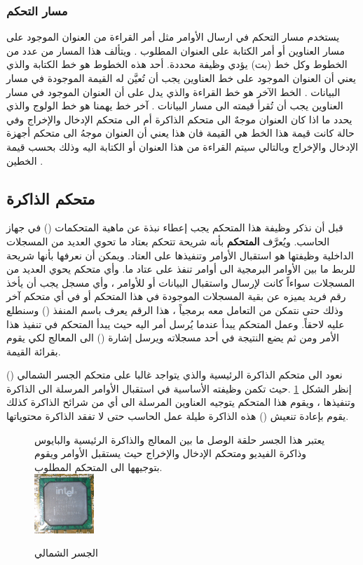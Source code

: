 \documentclass[document.tex]{subfiles}
\begin{document}
\subsubsection{مسار التحكم }
يستخدم مسار التحكم في ارسال الأوامر مثل أمر القراءة من العنوان الموجود على مسار العناوين أو أمر الكتابة على العنوان المطلوب . ويتألف هذا المسار من عدد من الخطوط وكل خط (بت) يؤدي وظيفة محددة. أحد هذه الخطوط هو خط الكتابة  والذي يعني أن العنوان الموجود على خط العناوين يجب أن تُعيَّن له القيمة الموجودة في مسار البيانات . الخط الآخر هو خط القراءة  والذي يدل على أن العنوان الموجود في مسار العناوين يجب أن تُقرأ قيمته الى مسار البيانات . آخر خط يهمنا هو خط الولوج  والذي يحدد ما اذا كان العنوان موجهٌ الى متحكم الذاكرة أم الى متحكم  الإدخال والإخراج وفي حالة كانت قيمة هذا الخط هي القيمة  فان هذا يعني أن العنوان موجهُ الى متحكم أجهزة الإدخال والإخراج وبالتالي سيتم القراءة من هذا العنوان أو الكتابة اليه وذلك بحسب قيمة الخطين .

\subsection{متحكم الذاكرة}
قبل أن نذكر وظيفة هذا المتحكم يجب إعطاء نبذة عن ماهية المتحكمات () في جهاز الحاسب. ويُعرَّف \textbf{المتحكم} بأنه شريحة تتحكم بعتاد ما تحوي العديد من المسجلات الداخلية وظيفتها هو استقبال الأوامر وتنفيذها على العتاد. ويمكن أن نعرفها بأنها شريحة للربط ما بين الأوامر البرمجية الى أوامر تنفذ على عتاد ما. وأي متحكم يحوي العديد من المسجلات سواءاً كانت لإرسال واستقبال البيانات أو للأوامر ، وأي مسجل يجب أن يأخذ رقم فريد يميزه عن بقية المسجلات الموجودة في هذا المتحكم أو في أي متحكم آخر وذلك حتى نتمكن من التعامل معه برمجياً ، هذا الرقم يعرف باسم المنفذ () وسنطلع عليه لاحقاً. وعمل المتحكم يبدأ عندما يُرسل أمر اليه حيث يبدأ المتحكم في تنفيذ هذا الأمر ومن ثم يضع النتيجة في أحد مسجلاته ويرسل إشارة () الى المعالج لكي يقوم بقرائة القيمة.

نعود الى متحكم الذاكرة الرئيسية والذي يتواجد غالبا على متحكم الجسر الشمالي () إنظر الشكل \ref{fig:nbridge} .حيث تكمن وظيفته الأساسية في استقبال الأوامر المرسلة الى الذاكرة وتنفيذها ، ويقوم هذا المتحكم يتوجيه العناوين المرسلة الى أي من شرائح الذاكرة كذلك يقوم بإعادة تنعيش () هذه الذاكرة طيلة عمل الحاسب حتى لا تفقد الذاكرة محتوياتها.

\begin{figure}[h!]
  \label{fig:nbridge} 
  \caption{الجسر الشمالي}
 {يعتبر هذا الجسر حلقة الوصل ما بين المعالج والذاكرة الرئيسية والبايوس وذاكرة الفيديو ومتحكم الإدخال والإخراج حيث يستقبل الأوامر ويقوم بتوجيهها الى المتحكم المطلوب.}
\\
  \centering
   \includegraphics[width=0.2\textwidth]{../img/nbridge}
\end{figure}
\end{document}
